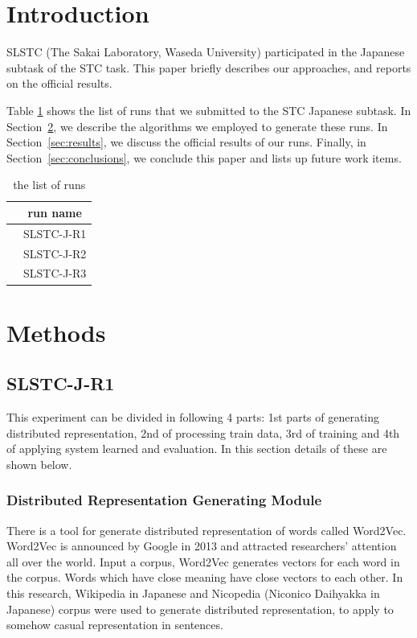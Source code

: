 \documentclass{../style/sig-alternate}
\begin{document}

\section{Introduction}

SLSTC (The Sakai Laboratory, Waseda University) participated in the
Japanese subtask of the STC task.
This paper briefly describes our approaches,
and reports on the official results.

Table \ref{tab:run_list}  shows the list of runs that we submitted to the STC Japanese subtask.
In Section~\ref{sec:methods}, we describe the algorithms we employed
to generate these runs.
In Section~\ref{sec:results}, we discuss the official results of our runs.
Finally, in Section~\ref{sec:conclusions}, we conclude this paper
and lists up future work items.

\begin{table}[h!]
  \centering
  \caption{the list of runs}
  \label{tab:run_list}
  \begin{tabular}{|c|} \hline
    　run name \\ \hline
    　SLSTC-J-R1 \\ \hline
    　SLSTC-J-R2 \\ \hline
    　SLSTC-J-R3 \\ \hline
  \end{tabular}
\end{table}

\section{Methods}
\label{sec:methods}

\subsection{SLSTC-J-R1}

This experiment can be divided in following 4 parts: 1st parts of generating distributed representation, 2nd of processing train data, 3rd of training and 4th of applying system learned and evaluation. In this section details of these are shown below.

\subsubsection{Distributed Representation Generating Module}

There is a tool for generate distributed representation of words called Word2Vec\cite{word2vec}.
Word2Vec is announced by Google in 2013 and attracted researchers’ attention all over the world.
Input a corpus, Word2Vec generates vectors for each word in the corpus.
Words which have close meaning have close vectors to each other.
In this research, Wikipedia in Japanese and Nicopedia (Niconico Daihyakka in Japanese) corpus were used to generate distributed representation, to apply to somehow casual representation in sentences.
\end{document}

